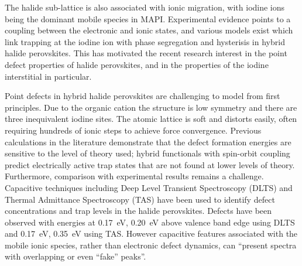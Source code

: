 The halide sub-lattice is also associated with ionic migration, with iodine ions being the dominant mobile species in MAPI.\autocite{Senocrate2017} 
Experimental evidence points to a coupling between the electronic and ionic states, and various models exist which link trapping at the iodine ion with phase segregation and hysterisis in hybrid halide perovskites.\autocite{dequilettes2016}
This has motivated the recent research interest in the point defect properties of halide perovskites, and in the properties of the iodine interstitial in particular.

Point defects in hybrid halide perovskites are challenging to model from first principles. Due to the organic cation the structure is low symmetry and there are three inequivalent iodine sites. The atomic lattice is soft and distorts easily, often requiring hundreds of ionic steps to achieve force convergence. 
Previous calculations in the literature demonstrate that the defect formation energies are sensitive to the level of theory used; hybrid functionals with spin-orbit coupling predict electrically active trap states that are not found at lower levels of theory.
Furthermore, comparison with experimental results remains a challenge. Capacitive techniques including Deep Level Transient Spectroscopy (DLTS) and Thermal Admittance Spectroscopy (TAS) have been used to identify defect concentrations and trap levels in the halide perovskites.
Defects have been observed with energies at \SI{0.17}{\electronvolt}, \SI{0.20}{\electronvolt} above valence band edge using DLTS\autocite{rosenberg2017} and \SI{0.17}{\electronvolt}, \SI{0.35}{\electronvolt} using TAS.
However capacitive features associated with the mobile ionic species, rather than electronic defect dynamics, can ``present spectra with overlapping or even ``fake'' peaks''.\autocite{Almora2019}

